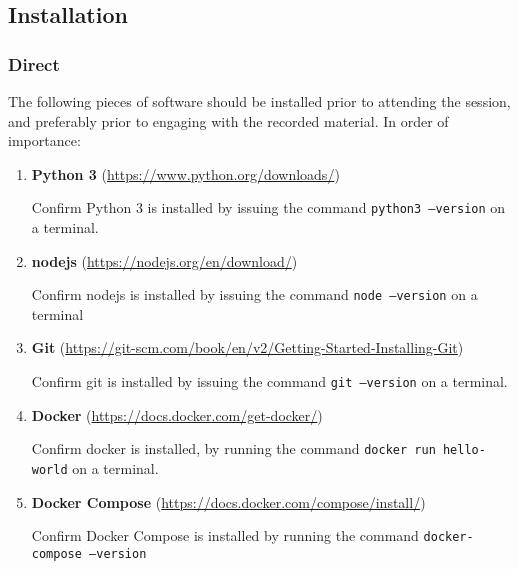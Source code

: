 \documentclass{article}
\begin{document}
\subsection{Installation}

\subsubsection{Direct}

The following pieces of software should be installed prior to attending
the session, and preferably prior to engaging with the recorded
material. In order of importance:

\begin{enumerate}

    \item \textbf{Python 3}
    (\href{https://www.python.org/downloads/}{https://www.python.org/downloads/})

    Confirm Python 3 is installed by issuing the command
    \texttt{python3 --version} on a terminal.

    \item \textbf{nodejs}
    (\href{https://nodejs.org/en/download/}{https://nodejs.org/en/download/})

    Confirm nodejs is installed by issuing the command
    \texttt{node --version} on a terminal

    \item \textbf{Git}
    (\href{https://git-scm.com/book/en/v2/Getting-Started-Installing-Git}{https://git-scm.com/book/en/v2/Getting-Started-Installing-Git})

    Confirm git is installed by issuing the command
    \texttt{git --version} on a terminal.

    \item \textbf{Docker}
    (\href{https://docs.docker.com/get-docker/}{https://docs.docker.com/get-docker/})

    Confirm docker is installed, by running the command
    \texttt{docker run hello-world} on a terminal.

    \item \textbf{Docker Compose}
    (\href{https://docs.docker.com/compose/install/}{https://docs.docker.com/compose/install/})

    Confirm Docker Compose is installed by running the command \newline
    \texttt{docker-compose --version}

\end{enumerate}
\end{document}
